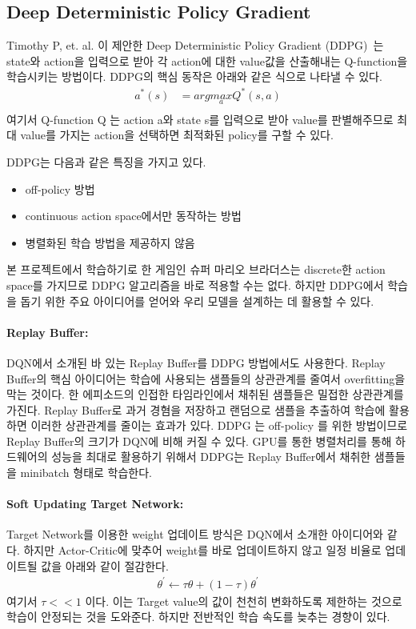 \subsection{Deep Deterministic Policy Gradient}
\label{sec:survey:DDPG}
Timothy P, et. al. 이 제안한 Deep Deterministic Policy Gradient (DDPG)~\cite{DDPG}는 state와 action을 입력으로 받아 각 action에 대한 value값을 산출해내는 Q-function을 학습시키는 방법이다.
DDPG의 핵심 동작은 아래와 같은 식으로 나타낼 수 있다.
\begin{align*}
	a^*(s) &= arg \underset{a}{max} Q^*(s,a) \\
\end{align*}
여기서 Q-function Q 는 action a와 state s를 입력으로 받아 value를 판별해주므로 최대 value를 가지는 action을 선택하면 최적화된 policy를 구할 수 있다.

DDPG는 다음과 같은 특징을 가지고 있다.
\begin{itemize}
	\item off-policy 방법
	\item continuous action space에서만 동작하는 방법
	\item 병렬화된 학습 방법을 제공하지 않음
\end{itemize}
본 프로젝트에서 학습하기로 한 게임인 슈퍼 마리오 브라더스는 discrete한 action space를 가지므로 DDPG 알고리즘을 바로 적용할 수는 없다.
하지만 DDPG에서 학습을 돕기 위한 주요 아이디어를 얻어와 우리 모델을 설계하는 데 활용할 수 있다.

\paragraph{\textbf{Replay Buffer:}}
DQN에서 소개된 바 있는 Replay Buffer를 DDPG 방법에서도 사용한다.
Replay Buffer의 핵심 아이디어는 학습에 사용되는 샘플들의 상관관계를 줄여서 overfitting을 막는 것이다.
한 에피소드의 인접한 타임라인에서 채취된 샘플들은 밀접한 상관관계를 가진다.
Replay Buffer로 과거 경혐을 저장하고 랜덤으로 샘플을 추출하여 학습에 활용하면 이러한 상관관계를 줄이는 효과가 있다.
DDPG 는 off-policy 를 위한 방법이므로 Replay Buffer의 크기가 DQN에 비해 커질 수 있다.
GPU를 통한 병렬처리를 통해 하드웨어의 성능을 최대로 활용하기 위해서 DDPG는 Replay Buffer에서 채취한 샘플들을 minibatch 형태로 학습한다.
\paragraph{\textbf{Soft Updating Target Network:}}
Target Network를 이용한 weight 업데이트 방식은 DQN에서 소개한 아이디어와 같다.
하지만 Actor-Critic에 맞추어 weight를 바로 업데이트하지 않고 일정 비율로 업데이트될 값을 아래와 같이 절감한다.
\begin{align*}
	\theta^{'} \leftarrow \tau\theta + (1 - \tau)\theta^{'}
\end{align*}
여기서 $\tau << 1$ 이다.
이는 Target value의 값이 천천히 변화하도록 제한하는 것으로 학습이 안정되는 것을 도와준다.
하지만 전반적인 학습 속도를 늦추는 경향이 있다.

